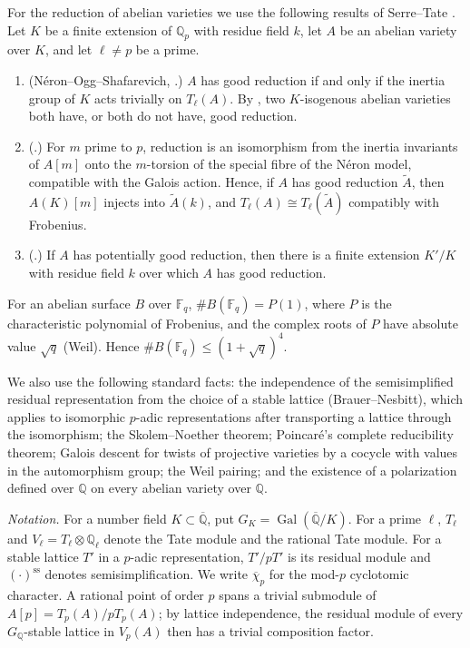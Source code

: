 \documentclass[11pt]{article}
\newcommand{\Q}{\mathbb Q}
\newcommand{\F}{\mathbb F}
\DeclareMathOperator{\Gal}{Gal}
\begin{document}
For the reduction of abelian varieties we use the following results of
Serre--Tate \cite{ST}. Let \(K\) be a finite extension of \(\Q_p\) with
residue field \(k\), let \(A\) be an abelian variety over \(K\), and let
\(\ell\neq p\) be a prime.
\begin{enumerate}
\item[(a)] (N\'eron--Ogg--Shafarevich, \cite[Theorem 1]{ST}.) \(A\) has
good reduction if and only if the inertia group of \(K\) acts trivially
on \(T_\ell(A)\). By \cite[Corollary 2 of Theorem 1]{ST}, two
\(K\)-isogenous abelian varieties both have, or both do not have, good
reduction.
\item[(b)] (\cite[Lemma 2]{ST}.) For \(m\) prime to \(p\), reduction is
an isomorphism from the inertia invariants of \(A[m]\) onto the
\(m\)-torsion of the special fibre of the N\'eron model, compatible with
the Galois action. Hence, if \(A\) has good reduction \(\widetilde A\),
then \(A(K)[m]\) injects into \(\widetilde A(k)\), and
\(T_\ell(A)\cong T_\ell(\widetilde A)\) compatibly with Frobenius.
\item[(c)] (\cite[\S2, p.~498]{ST}.) If \(A\) has potentially good
reduction, then there is a finite extension \(K'/K\) with residue field
\(k\) over which \(A\) has good reduction.
\end{enumerate}

For an abelian surface \(B\) over \(\F_q\), \(\#B(\F_q)=P(1)\), where
\(P\) is the characteristic polynomial of Frobenius, and the complex
roots of \(P\) have absolute value \(\sqrt q\) (Weil). Hence
\(\#B(\F_q)\leq(1+\sqrt q)^4\).

We also use the following standard facts: the independence of the
semisimplified residual representation from the choice of a stable
lattice (Brauer--Nesbitt), which applies to isomorphic \(p\)-adic
representations after transporting a lattice through the isomorphism;
the Skolem--Noether theorem; Poincar\'e's complete reducibility theorem;
Galois descent for twists of projective varieties by a cocycle with
values in the automorphism group; the Weil pairing; and the existence of
a polarization defined over \(\Q\) on every abelian variety over \(\Q\).

\emph{Notation.} For a number field \(K\subset\overline{\Q}\), put
\(G_K=\Gal(\overline{\Q}/K)\). For a prime \(\ell\), \(T_\ell\) and
\(V_\ell=T_\ell\otimes\Q_\ell\) denote the Tate module and the rational
Tate module. For a stable lattice \(T'\) in a \(p\)-adic representation,
\(T'/pT'\) is its residual module and \((\cdot)^{\mathrm{ss}}\) denotes
semisimplification. We write \(\overline\chi_p\) for the mod-\(p\)
cyclotomic character. A rational point of order \(p\) spans a trivial
submodule of \(A[p]=T_p(A)/pT_p(A)\); by lattice independence, the
residual module of every \(G_{\Q}\)-stable lattice in \(V_p(A)\) then has
a trivial composition factor.
\end{document}
